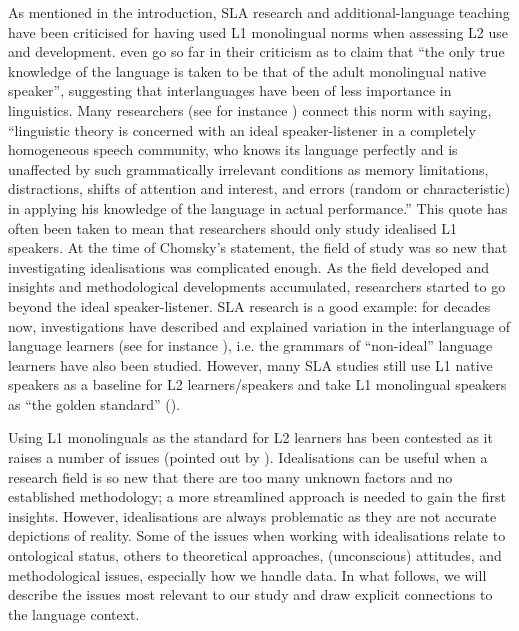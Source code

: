\documentclass[output=paper,colorlinks,citecolor=brown,modfonts,nonflat]{../langscibook}
\begin{document}
As mentioned in the introduction, SLA research and additional-language teaching have been criticised for having used L1 monolingual norms when assessing L2 use and development. \citet[221]{CookNewson2007} even go so far in their criticism as to claim that “the only true knowledge of the language is taken to be that of the adult monolingual native speaker”, suggesting that interlanguages have been of less importance in linguistics. Many researchers (see for instance \citealt{Saniei2011}) connect this norm with \citet[3]{Chomsky1965} saying, “linguistic theory is concerned with an ideal speaker-listener in a completely homogeneous speech community, who knows its language perfectly and is unaffected by such grammatically irrelevant conditions as memory limitations, distractions, shifts of attention and interest, and errors (random or characteristic) in applying his knowledge of the language in actual performance.” This quote has often been taken to mean that researchers should only study idealised L1 speakers. At the time of Chomsky’s statement, the field of study was so new that investigating idealisations was complicated enough. As the field developed and insights and methodological developments accumulated, researchers started to go beyond the ideal speaker-listener. SLA research is a good example: for decades now, investigations have described and explained variation in the interlanguage of language learners (see for instance \citealt{Corder1967,Selinker1972}), i.e. the grammars of “non-ideal” language learners have also been studied. However, many SLA studies still use L1 native speakers as a baseline for L2 learners/speakers and take L1 monolingual speakers as “the golden standard” (\citealt[29]{AmaralRoeper2014}).

Using L1 monolinguals as the standard for L2 learners has been contested as it raises a number of issues (pointed out by \citealt{CookNewson2007,AmaralRoeper2014,Slabakova2016,TheDouglasFirGroup2016,Ortega2019}). Idealisations can be useful when a research field is so new that there are too many unknown factors and no established methodology; a more streamlined approach is needed to gain the first insights. However, idealisations are always problematic as they are not accurate depictions of reality. Some of the issues when working with idealisations relate to ontological status, others to theoretical approaches, (unconscious) attitudes, and methodological issues, especially how we handle data. In what follows, we will describe the issues most relevant to our study and draw explicit connections to the  language context.
\end{document}

